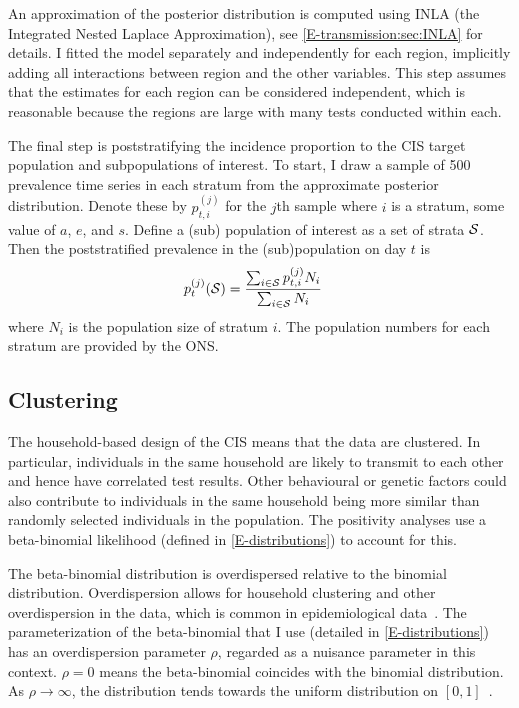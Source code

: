 \documentclass[thesis.tex]{subfiles}
\begin{document}
An approximation of the posterior distribution is computed using INLA (the Integrated Nested Laplace Approximation), see \cref{E-transmission:sec:INLA} for details.
I fitted the model separately and independently for each region, implicitly adding all interactions between region and the other variables.
This step assumes that the estimates for each region can be considered independent, which is reasonable because the regions are large with many tests conducted within each.

The final step is poststratifying the incidence proportion to the CIS target population and subpopulations of interest.
To start, I draw a sample of 500 prevalence time series in each stratum from the approximate posterior distribution.
Denote these by $p^{(j)}_{t,i}$ for the $j$th sample where $i$ is a stratum, \ie some value of $a$, $e$, and $s$.
Define a (sub) population of interest as a set of strata $\mathcal{S}$.
Then the poststratified prevalence in the (sub)population on day $t$ is
\begin{align}
p^{(j)}_t(\mathcal{S})
&= \frac{\sum_{i \in \mathcal{S}} p^{(j)}_{t,i} N_i}{\sum_{i \in \mathcal{S}} N_i}
\end{align}
where $N_i$ is the population size of stratum $i$.
The population numbers for each stratum are provided by the ONS.

\subsection{Clustering} \label{biology-data:sec:clustering}

The household-based design of the CIS means that the data are clustered.
In particular, individuals in the same household are likely to transmit to each other and hence have correlated test results.
Other behavioural or genetic factors could also contribute to individuals in the same household being more similar than randomly selected individuals in the population.
The positivity analyses use a beta-binomial likelihood (defined in \cref{E-distributions}) to account for this.

The beta-binomial distribution is overdispersed relative to the binomial distribution.
Overdispersion allows for household clustering and other overdispersion in the data, which is common in epidemiological data~\autocite{griffithsBBD}.
The parameterization of the beta-binomial that I use (detailed in \cref{E-distributions}) has an overdispersion parameter $\rho$, regarded as a nuisance parameter in this context.
$\rho=0$ means the beta-binomial coincides with the binomial distribution.
As $\rho \to \infty$, the distribution tends towards the uniform distribution on $[0, 1]$~\autocite{hughesUsing}.
\end{document}

